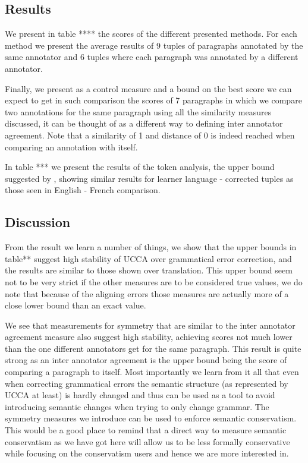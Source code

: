 \documentclass[english]{article}
\begin{document}
\subsection{Results}

We present in table {*}{*}{*}{*} the scores of the different presented
methods. For each method we present the average results of 9 tuples
of paragraphs annotated by the same annotator and 6 tuples where each
paragraph was annotated by a different annotator.

Finally, we present as a control measure and a bound on the best score
we can expect to get in such comparison the scores of 7 paragraphs
in which we compare two annotations for the same paragraph using all
the similarity measures discussed, it can be thought of as a different
way to defining inter annotator agreement. Note that a similarity
of 1 and distance of 0 is indeed reached when comparing an annotation
with itself.

In table {*}{*}{*} we present the results of the token analysis, the
upper bound suggested by \cite{sulem2015conceptual}, showing similar
results for learner language - corrected tuples as those seen in English
- French comparison.

\subsection{Discussion}

From the result we learn a number of things, we show that the upper
bounds in table{*}{*} suggest high stability of UCCA over grammatical
error correction, and the results are similar to those shown over
translation. This upper bound seem not to be very strict if the other
measures are to be considered true values, we do note that because
of the aligning errors those measures are actually more of a close
lower bound than an exact value.

We see that measurements for symmetry that are similar to the inter
annotator agreement measure also suggest high stability, achieving
scores not much lower than the one different annotators get for the
same paragraph. This result is quite strong as an inter annotator
agreement is the upper bound being the score of comparing a paragraph
to itself. Most importantly we learn from it all that even when correcting
grammatical errors the semantic structure (as represented by UCCA
at least) is hardly changed and thus can be used as a tool to avoid
introducing semantic changes when trying to only change grammar. The
symmetry measures we introduce can be used to enforce semantic conservatism.
This would be a good place to remind that a direct way to measure
semantic conservatism as we have got here will allow us to be less
formally conservative while focusing on the conservatism users and
hence we are more interested in.
\end{document}
